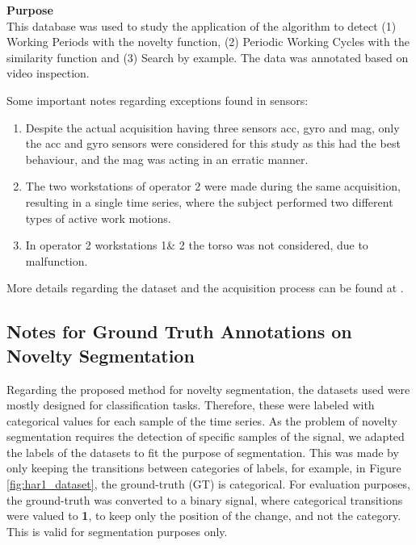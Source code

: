 \textbf{Purpose}\hfill \\
This database was used to study the application of the algorithm to detect (1) Working Periods with the novelty function, (2) Periodic Working Cycles with the similarity function and (3) Search by example. The data was annotated based on video inspection.
\par
Some important notes regarding exceptions found in sensors:
\begin{enumerate}
\item Despite the actual acquisition having three sensors \gls{acc}, \gls{gyro} and \gls{mag}, only the \gls{acc} and \gls{gyro} sensors were considered for this study as this had the best behaviour, and the \gls{mag} was acting in an erratic manner.
\item The two workstations of operator 2 were made during the same acquisition, resulting in a single time series, where the subject performed two different types of active work motions.
\item In operator 2 workstations 1\& 2 the torso was not considered, due to malfunction.
\end{enumerate}
More details regarding the dataset and the acquisition process can be found at \cite{sara2019, sara}.


\subsection{Notes for Ground Truth Annotations on Novelty Segmentation}

Regarding the proposed method for novelty segmentation, the datasets used were mostly designed for classification tasks. Therefore, these were labeled with categorical values for each sample of the time series. As the problem of novelty segmentation requires the detection of specific samples of the signal, we adapted the labels of the datasets to fit the purpose of segmentation. This was made by only keeping the transitions between categories of labels, for example, in Figure \ref{fig:har1_dataset}, the ground-truth (GT) is categorical. For evaluation purposes, the ground-truth was converted to a binary signal, where categorical transitions were valued to \textbf{1}, to keep only the position of the change, and not the category. This is valid for segmentation purposes only.